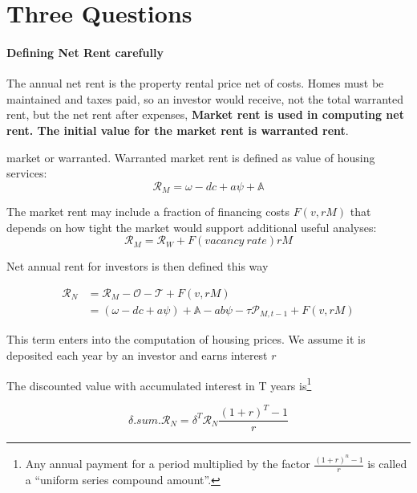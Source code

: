 {\color{orange}
\chapter{Three Questions}



\subsubsection{Defining Net Rent carefully}

The annual \gls{net rent} is the property rental price  net of costs. Homes must be maintained and taxes paid, so an investor would receive, not the total warranted rent, but the net rent after expenses,
\textbf{Market rent is used in computing net rent. The initial value for the market rent is \gls{warranted rent}}.

market or warranted.
Warranted market rent is defined as value of housing services:
\[\mathcal{R}_M = \omega - dc + a\psi + \mathbb{A}\]

The market rent may include  a fraction of financing costs $F(v, rM)$  that depends on how tight the market would support additional useful analyses:
 \[\mathcal{R}_M=\mathcal{R}_W + F(vacancy\ rate) rM\]
 

Net annual rent for investors is then  defined this way 

\begin{align}\mathcal{R}_N &= \mathcal{R}_M - \mathcal{O} - \mathcal{T} + F(v, rM)\nonumber\\
&= (\omega - {dc} + a\psi )+ \mathbb{A} - a b \psi - \tau  \mathcal{P}_{M, t-1}  + F(v, rM)
\end{align}

This term enters into the computation of housing prices. We assume it is deposited each year by an investor and earns interest $r$

}
{\color{blue}
The discounted value with accumulated interest in T years is\footnote{Any annual payment for a period multiplied by the factor $\frac{(1+r)^n-1}{r}$ is called a  ``uniform series compound amount''.%
}

\[\delta.sum.\mathcal{R}_N=
\delta^T\mathcal{R}_N 
\frac{(1+r)^T-1}{r} \]
}

